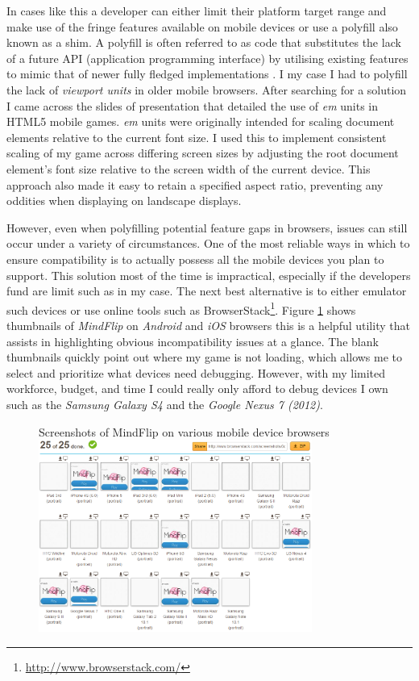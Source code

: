 \documentclass[final]{cmpreport}
\begin{document}
In cases like this a developer can either limit their platform target range and make use of the fringe features available on mobile devices or use a polyfill also known as a shim. A polyfill is often referred to as code that substitutes the lack of a future API (application programming interface) by utilising existing features to mimic that of newer fully fledged implementations \cite{Lawson}. I my case I had to polyfill the lack of \textit{viewport units} in older mobile browsers. After searching for a solution I came across the slides of \cite{Kadrmas} presentation that detailed the use of \textit{em} units in HTML5 mobile games. \textit{em} units were originally intended for scaling document elements relative to the current font size. I used this to implement consistent scaling of my game across differing screen sizes by adjusting the root document element's font size relative to the screen width of the current device. This approach also made it easy to retain a specified aspect ratio, preventing any oddities when displaying on landscape displays.


However, even when polyfilling potential feature gaps in browsers, issues can still occur under a variety of circumstances. One of the most reliable ways in which to ensure compatibility is to actually possess all the mobile devices you plan to support. This solution most of the time is impractical, especially if the developers fund are limit such as in my case. The next best alternative is to either emulator such devices or use online tools such as BrowserStack\footnote{\url{http://www.browserstack.com/}}. Figure \ref{browserstack} shows thumbnails of \textit{MindFlip} on \textit{Android} and \textit{iOS} browsers this is a helpful utility that assists in highlighting obvious incompatibility issues at a glance. The blank thumbnails quickly point out where my game is not loading, which allows me to select and prioritize what devices need debugging. However, with my limited workforce, budget, and time I could really only afford to debug devices I own such as the \textit{Samsung Galaxy S4} and the \textit{Google Nexus 7 (2012)}.

\begin{figure}[h]{Screenshots of MindFlip on various mobile device browsers \label{browserstack}}
  \centering
    \includegraphics[width=0.8\textwidth]{browserstack.png}
\end{figure}
\end{document}
